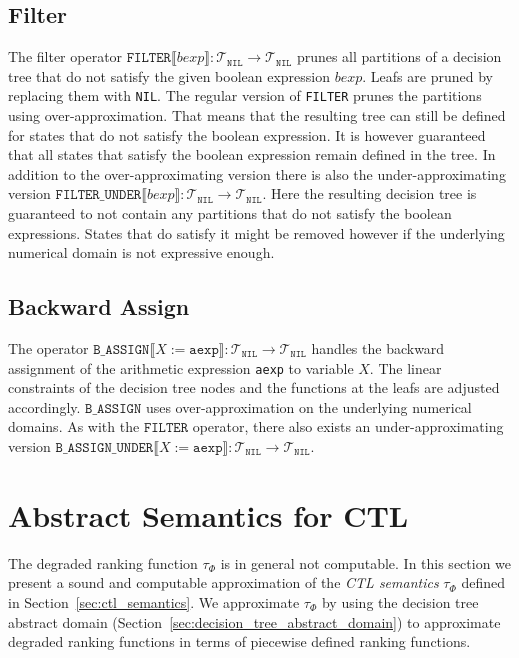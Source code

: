 \documentclass[11pt,a4paper,titlepage]{article}
\theoremstyle{definition}
\begin{document}
\subsection{Filter}\label{sec:tree_filter}
The filter operator $\mathtt{FILTER}\llbracket bexp \rrbracket \colon \mathcal{T}_\mathtt{NIL} \rightarrow \mathcal{T}_\mathtt{NIL}$
prunes all partitions of a decision tree that do not satisfy the given boolean expression $bexp$. Leafs are pruned by replacing them with \texttt{NIL}.
The regular version of \texttt{FILTER} prunes the partitions using over-approximation. 
That means that the resulting tree can still be defined for states that do not satisfy the boolean expression. It is however guaranteed that all states 
that satisfy the boolean expression remain defined in the tree. In addition to the over-approximating version there is also the under-approximating version
$\mathtt{FILTER\_UNDER}\llbracket bexp \rrbracket \colon \mathcal{T}_\mathtt{NIL} \rightarrow \mathcal{T}_\mathtt{NIL}$. Here the resulting decision
tree is guaranteed to not contain any partitions that do not satisfy the boolean expressions. States that do satisfy it might be removed however if
the underlying numerical domain is not expressive enough.

\subsection{Backward Assign}\label{sec:tree_bwd_assign}
The operator $\mathtt{B\_ASSIGN}\llbracket X := \mathtt{aexp} \rrbracket \colon \mathcal{T}_\mathtt{NIL} \rightarrow \mathcal{T}_\mathtt{NIL}$ handles
the backward assignment of the arithmetic expression \texttt{aexp} to variable $X$. The linear constraints of the decision tree nodes and the 
functions at the leafs are adjusted accordingly. $\mathtt{B\_ASSIGN}$ uses over-approximation on the underlying numerical domains. 
As with the $\mathtt{FILTER}$ operator, there also exists an under-approximating version 
$\mathtt{B\_ASSIGN\_UNDER}\llbracket X := \mathtt{aexp} \rrbracket \colon \mathcal{T}_\mathtt{NIL} \rightarrow \mathcal{T}_\mathtt{NIL}$.

\pagebreak

\section{Abstract Semantics for CTL}\label{sec:abstract_ctl_semantics}

The degraded ranking function $\tau_\Phi$ is in general not computable. 
In this section we present a sound and computable approximation of the \textit{CTL semantics} $\tau_\Phi$ defined in Section~\ref{sec:ctl_semantics}.
We approximate $\tau_\Phi$ by using the decision tree abstract domain (Section~\ref{sec:decision_tree_abstract_domain}) 
to approximate degraded ranking functions in terms of piecewise defined ranking functions.
\end{document}

